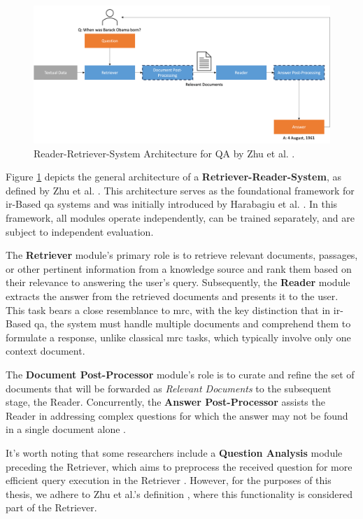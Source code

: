 \begin{figure}
    \centering
    \includegraphics[width=\textwidth]{Grafiken/Retriever_Reader.png}
    \caption{Reader-Retriever-System Architecture for QA by Zhu et al. \cite{zhu_retrieving_2021}.}
    \label{fig:rr_architecture}
\end{figure}

Figure \ref{fig:rr_architecture} depicts the general architecture of a \textbf{Retriever-Reader-System}, as defined by Zhu et al. \cite{zhu_retrieving_2021}. This architecture serves as the foundational framework for \gls{ir}-Based \gls{qa} systems and was initially introduced by Harabagiu et al. \cite{harabagiu_open-domain_2003}. In this framework, all modules operate independently, can be trained separately, and are subject to independent evaluation.

The \textbf{Retriever} module's primary role is to retrieve relevant documents, passages, or other pertinent information from a knowledge source and rank them based on their relevance to answering the user's query. Subsequently, the \textbf{Reader} module extracts the answer from the retrieved documents and presents it to the user. This task bears a close resemblance to \gls{mrc}, with the key distinction that in \gls{ir}-Based \gls{qa}, the system must handle multiple documents and comprehend them to formulate a response, unlike classical \gls{mrc} tasks, which typically involve only one context document.

The \textbf{Document Post-Processor} module's role is to curate and refine the set of documents that will be forwarded as \textit{Relevant Documents} to the subsequent stage, the Reader. Concurrently, the \textbf{Answer Post-Processor} assists the Reader in addressing complex questions for which the answer may not be found in a single document alone \cite{zhu_retrieving_2021,jurafsky_speech_2023}.

It's worth noting that some researchers include a \textbf{Question Analysis} module preceding the Retriever, which aims to preprocess the received question for more efficient query execution in the Retriever \cite{nassiri_transformer_2023}. However, for the purposes of this thesis, we adhere to Zhu et al.'s definition \cite{zhu_retrieving_2021}, where this functionality is considered part of the Retriever.

